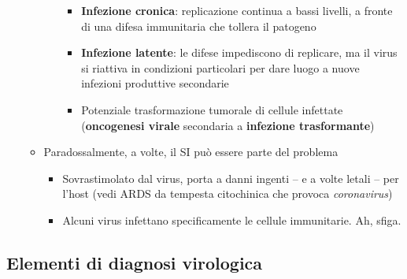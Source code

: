 \documentclass[italian,]{article}
\providecommand{\tightlist}{%
  \setlength{\itemsep}{0pt}\setlength{\parskip}{0pt}}
\begin{document}
\begin{itemize}
\begin{itemize}
\begin{itemize}
      \begin{itemize}
      \tightlist
      \item
        \textbf{Infezione cronica}: replicazione continua a bassi
        livelli, a fronte di una difesa immunitaria che tollera il
        patogeno
      \item
        \textbf{Infezione latente}: le difese impediscono di replicare,
        ma il virus si riattiva in condizioni particolari per dare luogo
        a nuove infezioni produttive secondarie
      \item
        Potenziale trasformazione tumorale di cellule infettate
        (\textbf{oncogenesi virale} secondaria a \textbf{infezione
        trasformante})
      \end{itemize}
    \end{itemize}
  \item
    Paradossalmente, a volte, il SI può essere parte del problema

    \begin{itemize}
    \tightlist
    \item
      Sovrastimolato dal virus, porta a danni ingenti -- e a volte
      letali -- per l'host (vedi ARDS da tempesta citochinica che
      provoca \emph{coronavirus})
    \item
      Alcuni virus infettano specificamente le cellule immunitarie. Ah,
      sfiga.
    \end{itemize}
  \end{itemize}
\end{itemize}

\hypertarget{elementi-di-diagnosi-virologica}{%
\subsection{Elementi di diagnosi
virologica}\label{elementi-di-diagnosi-virologica}}
\end{document}
